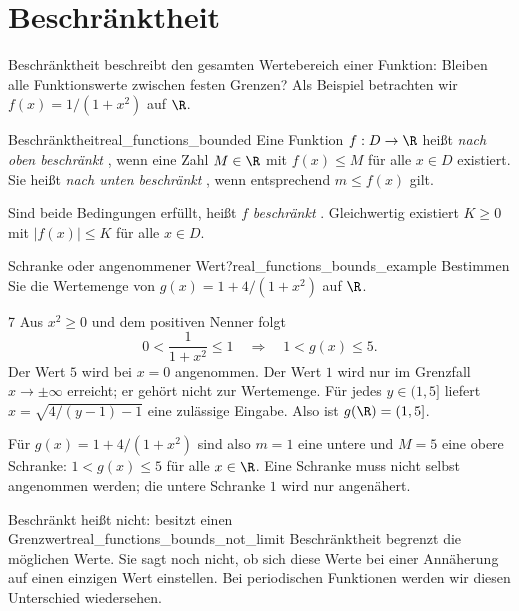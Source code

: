 \section{Beschränktheit}
\label{sec:real_functions_boundedness}
Beschränktheit beschreibt den gesamten Wertebereich einer Funktion:
Bleiben alle Funktionswerte zwischen festen Grenzen? Als Beispiel
betrachten wir $f(x)=1/(1+x^2)$ auf $\R$.
\begin{center}
\end{center}
\par\noindent\begin{minipage}{\linewidth}
\begin{FunctionPropertyBox}{Beschränktheit}{real_functions_bounded}
  Eine Funktion $f:D\to\R$ heißt \emph{nach oben beschränkt}
  , wenn eine Zahl $M\in\R$ mit
  $f(x)\le M$ für alle $x\in D$ existiert.
  Sie heißt \emph{nach unten beschränkt} ,
  wenn entsprechend $m\le f(x)$ gilt.

  Sind beide Bedingungen erfüllt, heißt $f$ \emph{beschränkt}
  . Gleichwertig existiert $K\ge0$ mit
  $|f(x)|\le K$ für alle $x\in D$.
\end{FunctionPropertyBox}
\begin{ExampleBox}[before skip=0.3\baselineskip]{Schranke oder angenommener Wert?}{real_functions_bounds_example}
  Bestimmen Sie die \textcolor{green!55!black}{Wertemenge} von $g(x)=1+4/(1+x^2)$ auf $\R$.
  \begin{ClozeArea}[34]{7}
    Aus $x^2\ge0$ und dem positiven Nenner folgt
    \[
      0<\frac1{1+x^2}\le1
      \quad\Longrightarrow\quad
      1<g(x)\le5.
    \]
    Der Wert $5$ wird bei $x=0$ angenommen. Der Wert $1$ wird nur
    im Grenzfall $x\to\pm\infty$ erreicht; er gehört nicht zur \textcolor{green!55!black}{Wertemenge}.
    Für jedes $y\in(1,5]$ liefert
    $x=\sqrt{4/(y-1)-1}$ eine zulässige Eingabe.
    Also ist $g(\R)=(1,5]$.
  \end{ClozeArea}
\end{ExampleBox}
\end{minipage}
\begin{center}
\end{center}
Für $g(x)=1+4/(1+x^2)$ sind also $m=1$ eine untere und $M=5$ eine
obere Schranke: $1<g(x)\le5$ für alle $x\in\R$. Eine Schranke muss
nicht selbst angenommen werden; die untere Schranke $1$ wird nur angenähert.

\begin{KeyPointBox}{Beschränkt heißt nicht: besitzt einen Grenzwert}{real_functions_bounds_not_limit}
  Beschränktheit begrenzt die möglichen Werte.
  Sie sagt noch nicht, ob sich diese Werte bei einer Annäherung auf
  einen einzigen Wert einstellen. Bei periodischen Funktionen werden
  wir diesen Unterschied wiedersehen.
\end{KeyPointBox}
